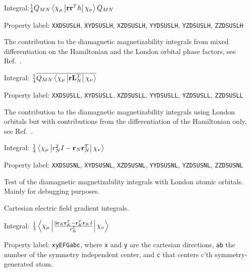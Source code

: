 \begin{description}
\begin{list}{}{}
\item Integral:$\frac{1}{4}Q_{MN}\left<\chi_{\mu}\left|{\bf
r}{\bf r}^{T}h\right|\chi_{\nu}\right>Q_{MN}$
\item Property label: \verb|XXDSUSLH|, \verb|XYDSUSLH|,
\verb|XZDSUSLH|, \verb|YYDSUSLH|, \verb|YZDSUSLH|, \verb|ZZDSUSLH|
\end{list}

\item[\Key{DSUSLL}] The contribution to the diamagnetic
magnetizability integrals from mixed differentiation on the Hamiltonian
and the London orbital phase factors, see Ref.~\cite{thpjjcp95}.

\begin{list}{}{}
\item Integral: $\frac{1}{4}\overline{Q_{MN}\left<\chi_{\mu}\left|{\bf
r}{\bf L}_{N}^{T}\right|\chi_{\nu}\right>}$
\item Property label: \verb|XXDSUSLL|, \verb|XYDSUSLL|,
\verb|XZDSUSLL|, \verb|YYDSUSLL|, \verb|YZDSUSLL|, \verb|ZZDSUSLL|
\end{list}

\item[\Key{DSUSNL}] The contribution to the diamagnetic
magnetizability integrals using
London orbitals but with
contributions from the differentiation of the Hamiltonian only, see
Ref.~\cite{thpjjcp95}.

\begin{list}{}{}
\item Integral: $\frac{1}{4}\left<\chi_{\mu}\left|r^{2}_{N}I - {\bf r}_{N}
{\bf r}_{N}^{T}\right|\chi_{\nu}\right>$
\item Property label: \verb|XXDSUSNL|, \verb|XYDSUSNL|,
\verb|XZDSUSNL|, \verb|YYDSUSNL|, \verb|YZDSUSNL|, \verb|ZZDSUSNL|
\end{list}

\item[\Key{DSUTST}] Test of the diamagnetic magnetizability
integrals with London atomic
orbitals. Mainly for debugging purposes.

\item[\Key{EFGCAR}] Cartesian electric field gradient
integrals.

\begin{list}{}{}
\item Integral: $\frac{1}{3}\left<\chi_{\mu}\left|\frac{3{\bf
r}_K{\bf r}_K^T - {\bf r}_K^T{\bf r}_KI}{r_K^5}\right|\chi_{\nu}\right>$
\item Property label: \verb|xyEFGabc|, where \verb|x| and \verb|y| are
the cartesian directions, \verb|ab| the number of the symmetry
independent center, and \verb|c| that centers c'th symmetry-generated
atom.
\end{list}


\end{description}

